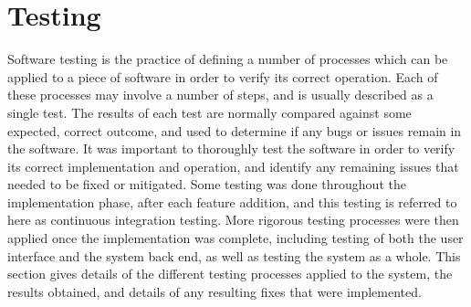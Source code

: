 
\chapter[Testing]{Testing} %

\label{Chapter10} %


Software testing is the practice of defining a number of processes which can be applied to a piece of software in order to verify its correct operation. Each of these processes may involve a number of steps, and is usually described as a single test. The results of each test are normally compared against some expected, correct outcome, and used to determine if any bugs or issues remain in the software. It was important to thoroughly test the software in order to verify its correct implementation and operation, and identify any remaining issues that needed to be fixed or mitigated. Some testing was done throughout the implementation phase, after each feature addition, and this testing is referred to here as continuous integration testing. More rigorous testing processes were then applied once the implementation was complete, including testing of both the user interface and the system back end, as well as testing the system as a whole. This section gives details of the different testing processes applied to the system, the results obtained, and details of any resulting fixes that were implemented.



